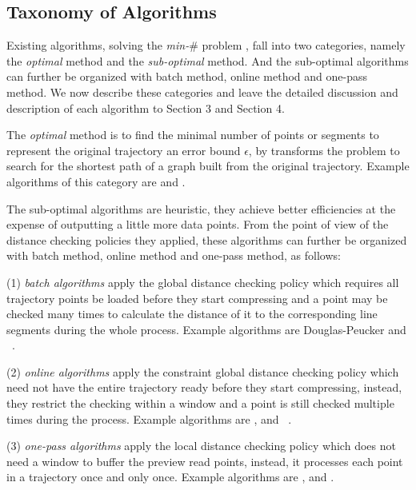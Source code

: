 \subsection {Taxonomy of Algorithms}
\label{subsec-taxonomy}

Existing \lsa algorithms, solving the \emph{min-$\#$} problem \cite{Chan:Optimal, Imai:Optimal,Pavlidis:Segment}, fall into two categories, namely the \textit{optimal} method and the \textit{sub-optimal} method. And the sub-optimal algorithms can further be organized with batch method, online method and one-pass method.
We now describe these categories and leave the detailed discussion and description of each algorithm to Section 3 and Section 4.

The \textit{optimal} method is to find the minimal number of points or segments to represent the original trajectory \wrt an error bound $\epsilon$, by transforms the problem to search for the shortest path of a graph built from the original trajectory.
Example algorithms of this category are \opt \cite{Chan:Optimal} and \optp \cite{Chan:Optimal}.

The sub-optimal algorithms are heuristic, they achieve better efficiencies at the expense of outputting a little more data points.
From the point of view of the distance checking policies they applied, these algorithms can further be organized with
batch method, online method and one-pass method, as follows:

\ni (1) \textit{batch algorithms} apply the global distance checking policy which requires all trajectory points be loaded before they start compressing and a point may be checked many times to calculate the distance of it to the corresponding line segments during the whole process. Example algorithms are Douglas-Peucker\cite{Douglas:Peucker,Meratnia:Spatiotemporal} and \pavlidis~\cite{Pavlidis:Segment}. 

\ni (2) \textit{online algorithms} apply the constraint global distance checking policy which need not have the entire trajectory ready before they start compressing, instead, they restrict the checking within a window and a point is still checked multiple times during the process. Example algorithms are \opwa \cite{Meratnia:Spatiotemporal}, \bqsa\cite{Liu:BQS} and \squishe~\cite{Muckell:SQUISH}.

\ni (3) \textit{one-pass algorithms} apply the local distance checking policy which does not need a window to buffer the preview read points, instead, it processes each point in a trajectory once and only once. Example algorithms are \operb\cite{Lin:Operb}, \siped \cite{Williams:Longest,Sklansky:Cone,Dunham:Cone, Zhao:Sleeve} and \cised \cite{Lin:Cised}.

